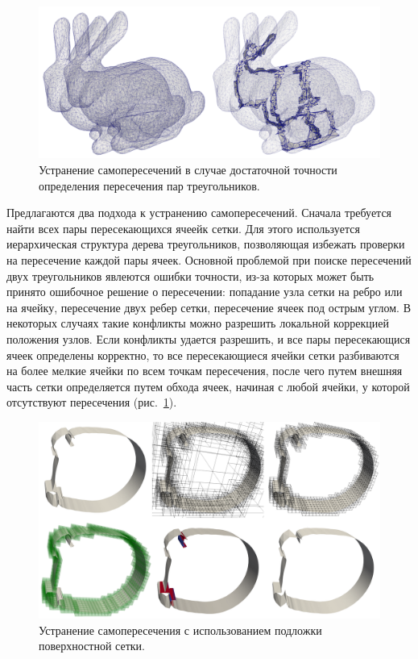 \documentclass[a4paper,14pt]{extarticle}                     %
\theoremstyle{plain}                                         %
\begin{document}
\begin{figure}[!ht]
\centering
\includegraphics[width=1.0\textwidth]{./pics/text_1_int/bunnies_dbl.png}
\singlespacing
{}\caption{Устранение самопересечений в случае достаточной точности определения пересечения пар треугольников.}
\label{fig:text_1_int_1}
\end{figure}

Предлагаются два подхода к устранению самопересечений.
Сначала требуется найти всех пары пересекающихся ячеейк сетки.
Для этого используется иерархическая структура дерева треугольников, позволяющая избежать проверки на пересечение каждой пары ячеек.
Основной проблемой при поиске пересечений двух треугольников явлеются ошибки точности, из-за которых может быть принято ошибочное решение о пересечении: попадание узла сетки на ребро или на ячейку, пересечение двух ребер сетки, пересечение ячеек под острым углом.
В некоторых случаях такие конфликты можно разрешить локальной коррекцией положения узлов.
Если конфликты удается разрешить, и все пары пересекающися ячеек определены корректно, то все пересекающиеся ячейки сетки разбиваются на более мелкие ячейки по всем точкам пересечения, после чего путем внешняя часть сетки определяется путем обхода ячеек, начиная с любой ячейки, у которой отсутствуют пересечения (рис.~\ref{fig:text_1_int_1}).

\begin{figure}[!ht]
\centering
\includegraphics[width=1.0\textwidth]{./pics/text_1_int/wing_all.png}
\singlespacing
{}\caption{Устранение самопересечения с использованием подложки поверхностной сетки.}
\label{fig:text_1_int_2}
\end{figure}
\end{document}
